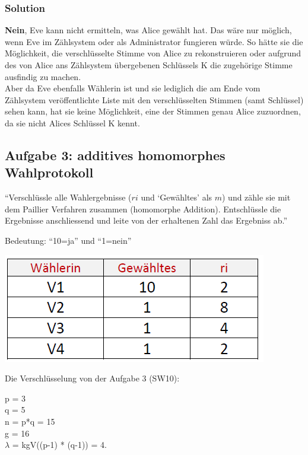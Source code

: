 \documentclass[11pt]{article}
\begin{document}
\hypertarget{solution}{%
\subsubsection{Solution}\label{solution}}

\textbf{Nein}, Eve kann nicht ermitteln, was Alice gewählt hat. Das wäre
nur möglich, wenn Eve im Zählsystem oder als Administrator fungieren
würde. So hätte sie die Möglichkeit, die verschlüsselte Stimme von Alice
zu rekonstruieren oder aufgrund des von Alice ans Zählsystem übergebenen
Schlüssels K die zugehörige Stimme ausfindig zu machen.\\
Aber da Eve ebenfalls Wählerin ist und sie lediglich die am Ende vom
Zählsystem veröffentlichte Liste mit den verschlüsselten Stimmen (samt
Schlüssel) sehen kann, hat sie keine Möglichkeit, eine der Stimmen genau
Alice zuzuordnen, da sie nicht Alices Schlüssel K kennt.

    \hypertarget{aufgabe-3-additives-homomorphes-wahlprotokoll}{%
\subsection{Aufgabe 3: additives homomorphes
Wahlprotokoll}\label{aufgabe-3-additives-homomorphes-wahlprotokoll}}

``Verschlüssle alle Wahlergebnisse (\(ri\) und `Gewähltes' als \(m\))
und zähle sie mit dem Paillier Verfahren zusammen (homomorphe Addition).
Entschlüssle die Ergebnisse anschliessend und leite von der erhaltenen
Zahl das Ergebniss ab.''

Bedeutung: ``10=ja'' und ``1=nein''

\includegraphics[scale=0.5]{img/votetable.png}

Die Verschlüsselung von der Aufgabe 3 (SW10):

p = 3\\
q = 5\\
n = p*q = 15\\
g = 16\\
\(\lambda\) = kgV((p-1) * (q-1)) = 4.
\end{document}
